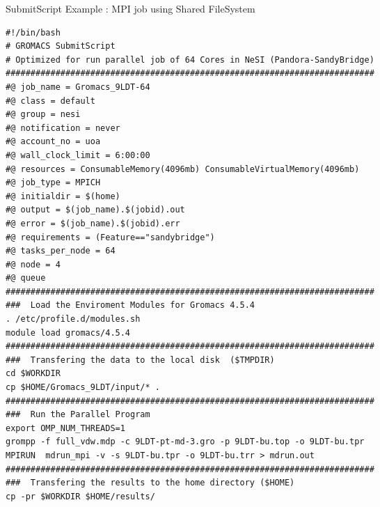 \documentclass[final,t]{beamer}
\begin{document}
\begin{frame}[fragile]{}
\begin{columns}[t]
\begin{column}{.3\linewidth}
    \end{column}

    
    \begin{column}{.35\linewidth}
    
      \begin{block}{SubmitScript Example : MPI job using Shared FileSystem}
              \vspace*{-3ex}
        \begin{verbatim}
#!/bin/bash 
# GROMACS SubmitScript 
# Optimized for run parallel job of 64 Cores in NeSI (Pandora-SandyBridge)
##########################################################################
#@ job_name = Gromacs_9LDT-64
#@ class = default
#@ group = nesi
#@ notification = never
#@ account_no = uoa
#@ wall_clock_limit = 6:00:00
#@ resources = ConsumableMemory(4096mb) ConsumableVirtualMemory(4096mb)
#@ job_type = MPICH
#@ initialdir = $(home)
#@ output = $(job_name).$(jobid).out
#@ error = $(job_name).$(jobid).err
#@ requirements = (Feature=="sandybridge")
#@ tasks_per_node = 64
#@ node = 4
#@ queue
########################################################################## 
###  Load the Enviroment Modules for Gromacs 4.5.4
. /etc/profile.d/modules.sh
module load gromacs/4.5.4
########################################################################## 
###  Transfering the data to the local disk  ($TMPDIR)
cd $WORKDIR
cp $HOME/Gromacs_9LDT/input/* .
########################################################################## 
###  Run the Parallel Program
export OMP_NUM_THREADS=1
grompp -f full_vdw.mdp -c 9LDT-pt-md-3.gro -p 9LDT-bu.top -o 9LDT-bu.tpr
MPIRUN  mdrun_mpi -v -s 9LDT-bu.tpr -o 9LDT-bu.trr > mdrun.out 
########################################################################## 
###  Transfering the results to the home directory ($HOME) 
cp -pr $WORKDIR $HOME/results/
        \end{verbatim}
        \vspace*{-4ex}
      \end{block}



\end{column}
\end{columns}
\end{frame}
\end{document}
